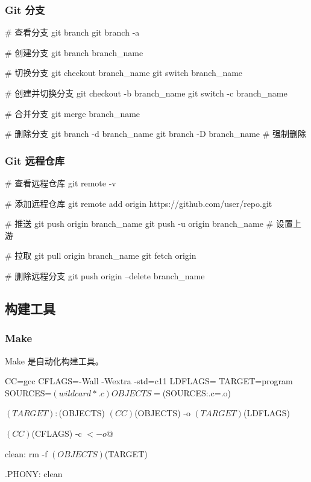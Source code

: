 \subsubsection{Git 分支}


\begin{lstcode}[numbers=none]
  # 查看分支
  git branch
  git branch -a

  # 创建分支
  git branch branch_name

  # 切换分支
  git checkout branch_name
  git switch branch_name

  # 创建并切换分支
  git checkout -b branch_name
  git switch -c branch_name

  # 合并分支
  git merge branch_name

  # 删除分支
  git branch -d branch_name
  git branch -D branch_name  # 强制删除
\end{lstcode}

\subsubsection{Git 远程仓库}


\begin{lstcode}[numbers=none]
  # 查看远程仓库
  git remote -v

  # 添加远程仓库
  git remote add origin https://github.com/user/repo.git

  # 推送
  git push origin branch_name
  git push -u origin branch_name  # 设置上游

  # 拉取
  git pull origin branch_name
  git fetch origin

  # 删除远程分支
  git push origin --delete branch_name
\end{lstcode}

\subsection{构建工具}

\subsubsection{Make}

Make 是自动化构建工具。


\begin{lstcode}[numbers=none]
CC=gcc
CFLAGS=-Wall -Wextra -std=c11
LDFLAGS=
TARGET=program
SOURCES=$(wildcard *.c)
OBJECTS=$(SOURCES:.c=.o)

$(TARGET): $(OBJECTS)
	$(CC) $(OBJECTS) -o $(TARGET) $(LDFLAGS)

	$(CC) $(CFLAGS) -c $< -o $@

clean:
	rm -f $(OBJECTS) $(TARGET)

.PHONY: clean
\end{lstcode}

